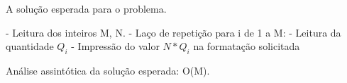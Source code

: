 A solução esperada para o problema.

- Leitura dos inteiros M, N.
- Laço de repetição para i de 1 a M:
    - Leitura da quantidade $Q_i$
    - Impressão do valor $N*Q_i$ na formatação solicitada

Análise assintótica da solução esperada: O(M).
